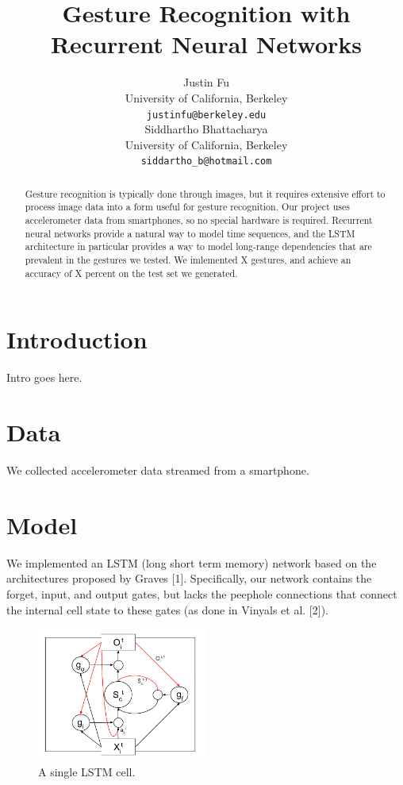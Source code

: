 \documentclass[11pt]{article}
\title{Gesture Recognition with Recurrent Neural Networks}
\author{Justin Fu \\
  University of California, Berkeley\\
  {\tt justinfu@berkeley.edu} \\\And
  Siddhartho Bhattacharya \\
  University of California, Berkeley\\
  {\tt siddartho\_b@hotmail.com} \\}
\date{}
\begin{document}
\maketitle 
\begin{abstract}
  Gesture recognition is typically done through images, but it requires
  extensive effort to process image data into a form useful for gesture
  recognition. Our project uses accelerometer data from smartphones,
  so no special hardware is required.
  Recurrent neural networks provide a natural way to model time
  sequences, and the LSTM architecture in particular provides a way
  to model long-range dependencies that are prevalent in
  the gestures we tested. We imlemented X gestures, and achieve an
  accuracy of X percent on the test set we generated.
\end{abstract}

\section{Introduction}

Intro goes here.

\section{Data}

We collected accelerometer data streamed from a smartphone.

\section{Model}
\label{sect:pdf}

We implemented an LSTM (long short term memory) network based on
the architectures proposed by Graves [1]. Specifically,
our network contains the forget, input, and output gates, but lacks the
peephole connections that connect the internal cell state to these gates
(as done in Vinyals et al. [2]).

\begin{figure}[ht]
\caption{A single LSTM cell.}
  \centering
    \includegraphics[width=0.5\textwidth]{lstm_cell}
\end{figure}
\end{document}
